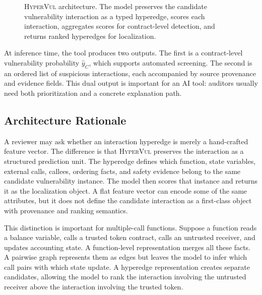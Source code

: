 \documentclass[conference]{IEEEtran}
\newcommand{\tool}{\textsc{HyperVul}}
\begin{document}
\begin{figure}[t]
{%
}
\caption{\tool{} architecture. The model preserves the candidate vulnerability interaction as a typed hyperedge, scores each interaction, aggregates scores for contract-level detection, and returns ranked hyperedges for localization.}
\label{fig:architecture}
\end{figure}

At inference time, the tool produces two outputs. The first is a contract-level vulnerability probability $\hat{y}_C$, which supports automated screening. The second is an ordered list of suspicious interactions, each accompanied by source provenance and evidence fields. This dual output is important for an AI tool: auditors usually need both prioritization and a concrete explanation path.

\subsection{Architecture Rationale}

A reviewer may ask whether an interaction hyperedge is merely a hand-crafted feature vector. The difference is that \tool{} preserves the interaction as a structured prediction unit. The hyperedge defines which function, state variables, external calls, callees, ordering facts, and safety evidence belong to the same candidate vulnerability instance. The model then scores that instance and returns it as the localization object. A flat feature vector can encode some of the same attributes, but it does not define the candidate interaction as a first-class object with provenance and ranking semantics.

This distinction is important for multiple-call functions. Suppose a function reads a balance variable, calls a trusted token contract, calls an untrusted receiver, and updates accounting state. A function-level representation merges all these facts. A pairwise graph represents them as edges but leaves the model to infer which call pairs with which state update. A hyperedge representation creates separate candidates, allowing the model to rank the interaction involving the untrusted receiver above the interaction involving the trusted token.
\end{document}
